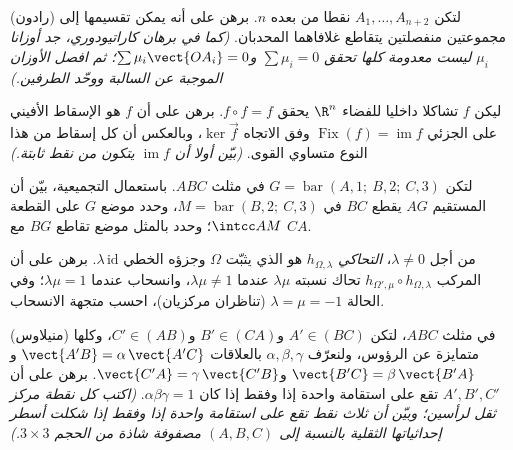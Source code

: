 \begin{exercise}[$\star\star\star$]\label{exo:b2:affine:7}
(رادون) لتكن $A_1, \dots, A_{n+2}$ نقطا من  بعده $n$. برهن على أنه
يمكن تقسيمها إلى مجموعتين منفصلتين يتقاطع غلافاهما المحدبان.
\emph{(كما في برهان كاراتيودوري، جد أوزانا $\mu_i$ ليست معدومة كلها
تحقق $\sum\mu_i = 0$ و$\sum\mu_i\vect{OA_i} = 0$؛ ثم افصل الأوزان الموجبة عن السالبة ووحّد
الطرفين.)}
\end{exercise}

\begin{exercise}[$\star\star\star$]\label{exo:b2:affine:8}
ليكن $f$ تشاكلا  داخليا للفضاء $\R^n$ يحقق $f \circ f = f$. برهن
على أن $f$ هو الإسقاط الأفيني على  الجزئي $\operatorname{Fix}(f) = \operatorname{im} f$
وفق الاتجاه $\ker\vec f$، وبالعكس أن كل إسقاط من هذا النوع متساوي القوى.
\emph{(بيّن أولا أن $\operatorname{im} f$ يتكون من نقط ثابتة.)}
\end{exercise}

\begin{exercise}[$\star$]\label{exo:b2:affine:9}
لتكن $G = \operatorname{bar}(A, 1;\ B, 2;\ C, 3)$ في مثلث $ABC$. باستعمال التجميعية، بيّن أن المستقيم
$AG$ يقطع $BC$ في $M = \operatorname{bar}(B, 2;\ C, 3)$، وحدد موضع $G$ على القطعة $\intcc AM$؛
وحدد بالمثل موضع تقاطع $BG$ مع $CA$.
\end{exercise}

\begin{exercise}[$\star\star$]\label{exo:b2:affine:10}
من أجل $\lambda \neq 0$، \emph{التحاكي} $h_{\Omega,
\lambda}$ هو  الذي يثبّت
$\Omega$ وجزؤه الخطي $\lambda\,\mathrm{id}$. برهن على أن المركب $h_{\Omega', \mu} \circ h_{\Omega, \lambda}$ تحاك نسبته
$\lambda\mu$ عندما $\lambda\mu \neq 1$، وانسحاب عندما $\lambda\mu = 1$؛ وفي الحالة $\lambda = \mu = -1$
(تناظران مركزيان)، احسب متجهة الانسحاب.
\end{exercise}

\begin{exercise}[$\star\star$]\label{exo:b2:affine:11}
(منيلاوس) في مثلث $ABC$، لتكن $A' \in (BC)$ و$B' \in
(CA)$ و$C' \in (AB)$، وكلها
متمايزة عن الرؤوس، ولنعرّف $\alpha, \beta, \gamma$ بالعلاقات $\vect{A'B} =
\alpha\,\vect{A'C}$ و$\vect{B'C} = \beta\,\vect{B'A}$
و$\vect{C'A} = \gamma\,\vect{C'B}$. برهن على أن $A', B', C'$ تقع على استقامة واحدة إذا وفقط إذا كان
$\alpha\beta\gamma = 1$. \emph{(اكتب كل نقطة مركز ثقل لرأسين؛ وبيّن أن ثلاث نقط تقع
على استقامة واحدة إذا وفقط إذا شكلت أسطر إحداثياتها الثقلية بالنسبة
إلى $(A, B, C)$ مصفوفة شاذة من الحجم $3 \times 3$.)}
\end{exercise}

